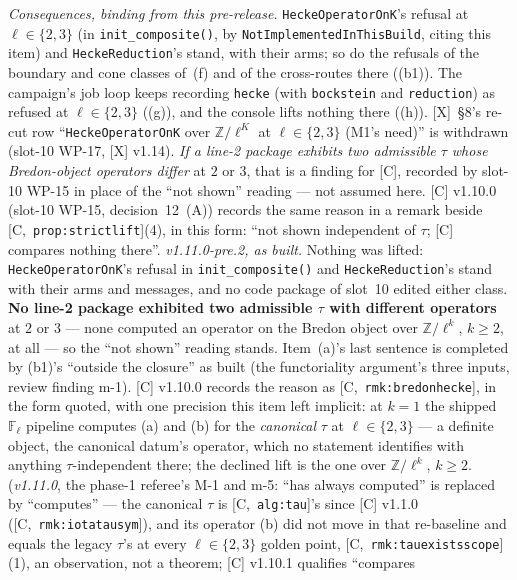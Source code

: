 \documentclass[11pt]{article}
\theoremstyle{remark}
\newcommand{\F}{\mathbb{F}}
\newcommand{\Z}{\mathbb{Z}}
\newcommand{\Fl}{\F_\ell}
\newcommand{\HA}[1]{[C,~\texttt{#1}]}      %
\begin{document}
\begin{enumerate}[label=(b\arabic*)]
\begin{enumerate}[label=(\alph*)]
  \end{enumerate}
  \emph{Consequences, binding from this pre-release.} \texttt{HeckeOperatorOnK}'s refusal at
  $\ell\in\{2,3\}$ (in \texttt{init\_composite()}, by \texttt{NotImplementedInThisBuild}, citing this
  item) and \texttt{HeckeReduction}'s stand, with their arms; so do the refusals of the boundary and
  cone classes of~(f) and of the cross-routes there ((b1)). The campaign's job loop keeps recording
  \texttt{hecke} (with \texttt{bockstein} and \texttt{reduction}) as refused at $\ell\in\{2,3\}$
  ((g)), and the console lifts nothing there ((h)). [X]~\S8's re-cut row ``\texttt{HeckeOperatorOnK}
  over $\Z/\ell^K$ at $\ell\in\{2,3\}$ (M1's need)'' is withdrawn (slot-10 WP-17, [X] v1.14). \emph{If
  a line-2 package exhibits two admissible $\tau$ whose Bredon-object operators differ} at $2$ or
  $3$, that is a finding for [C], recorded by slot-10 WP-15 in place of the ``not shown'' reading ---
  not assumed here. [C] v1.10.0 (slot-10 WP-15, decision~12~(A)) records the same reason in a remark
  beside \HA{prop:strictlift}(4), in this form: ``not shown independent of $\tau$; [C] compares
  nothing there''.
  \emph{v1.11.0-pre.2, as built.} Nothing was lifted: \texttt{HeckeOperatorOnK}'s refusal in
  \texttt{init\_composite()} and \texttt{HeckeReduction}'s stand with their arms and messages, and no
  code package of slot~10 edited either class. \textbf{No line-2 package exhibited two admissible
  $\tau$ with different operators} at $2$ or $3$ --- none computed an operator on the Bredon object
  over $\Z/\ell^k$, $k\ge2$, at all --- so the ``not shown'' reading stands. Item~(a)'s last sentence is
  completed by (b1)'s ``outside the closure'' as built (the functoriality argument's three inputs,
  review finding m-1). [C] v1.10.0 records the reason as \HA{rmk:bredonhecke}, in the form quoted,
  with one precision this item left implicit: at $k=1$ the shipped $\Fl$ pipeline computes (a) and
  (b) for the \emph{canonical} $\tau$ at $\ell\in\{2,3\}$ --- a definite object, the canonical
  datum's operator, which no statement identifies with anything $\tau$-independent there; the
  declined lift is the one over $\Z/\ell^k$, $k\ge2$. (\emph{v1.11.0}, the phase-1 referee's M-1 and
  m-5: ``has always computed'' is replaced by ``computes'' --- the canonical $\tau$ is
  \HA{alg:tau}'s since [C] v1.1.0 (\HA{rmk:iotatausym}), and its operator (b) did not move in that
  re-baseline and equals the legacy $\tau$'s at every $\ell\in\{2,3\}$ golden point,
  \HA{rmk:tauexistsscope}(1), an observation, not a theorem; [C] v1.10.1 qualifies ``compares

\end{enumerate}
\end{document}
